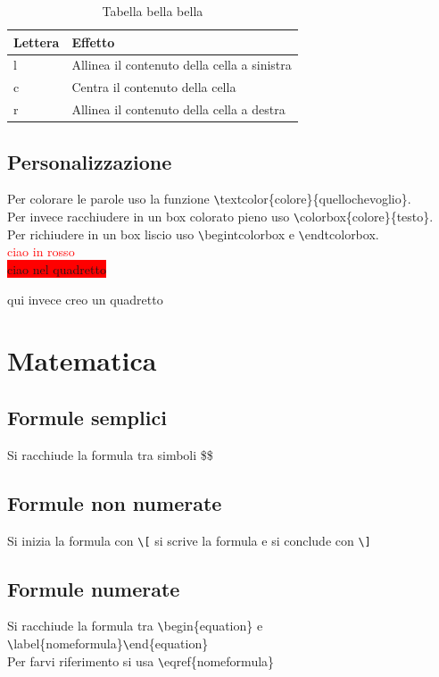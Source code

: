 \begin{table}
\centering
\begin{tabular}{ll}
\toprule
Lettera & Effetto \\
\midrule
l & Allinea il contenuto della cella a sinistra \\
c & Centra il contenuto della cella \\
r & Allinea il contenuto della cella a destra \\
\bottomrule
\end{tabular}
\caption{Tabella bella bella}
\end{table}

\section{Personalizzazione}
Per colorare le parole uso la funzione \verb|\|textcolor\{colore\}\{quellochevoglio\}.\\
Per invece racchiudere in un box colorato pieno uso \verb|\|colorbox\{colore\}\{testo\}.\\
Per richiudere in un box liscio uso \verb|\|begin{tcolorbox} e \verb|\|end{tcolorbox}.\\

\textcolor{red}{ciao in rosso} \\
\colorbox{red}{ciao nel quadretto} \\
\begin{tcolorbox}
qui invece creo un quadretto
\end{tcolorbox}

\chapter{Matematica}
\section{Formule semplici}
Si racchiude la formula tra simboli \$\$
\section{Formule non numerate}
Si inizia la formula con \verb|\[| si scrive la formula e si conclude con \verb|\]|
\section{Formule numerate}
Si racchiude la formula tra \verb|\|begin\{equation\} e \verb|\|label\{nomeformula\}\verb|\|end\{equation\}\\
Per farvi riferimento si usa \verb|\|eqref\{nomeformula\}
